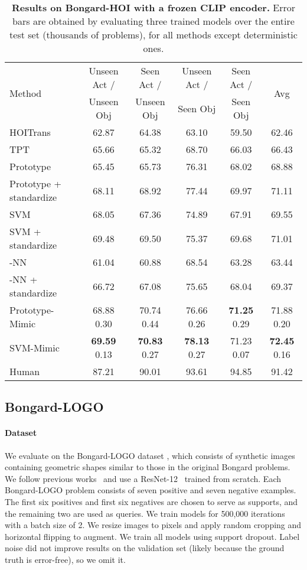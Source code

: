 \begin{table*}
  \centering
    \begin{tabular}{lccccc}
    \toprule
    \multirow{2}{*}{Method} & Unseen Act / & Seen Act / & Unseen Act / & Seen Act /  & \multirow{2}{*}{Avg} \\
    & Unseen Obj & Unseen Obj & Seen Obj & Seen Obj & \\
    \midrule
    HOITrans~\cite{zou2021endtoend} &  62.87  &  64.38  &  63.10  &  59.50  &  62.46  \\
    TPT~\cite{shu2022testtime} &  65.66  &  65.32  &  68.70  &  66.03  &  66.43  \\
    \midrule
    Prototype &  65.45  &  65.73  &  76.31  &  68.02  &  68.88  \\
    Prototype + standardize &  68.11  &  68.92  &  77.44  &  69.97  &  71.11  \\
    SVM & 68.05 & 67.36 & 74.89 & 67.91 & 69.55 \\
    SVM + standardize & 69.48 & 69.50 & 75.37 & 69.68 & 71.01 \\
    -NN & 61.04 & 60.88 & 68.54 & 63.28 & 63.44 \\
    -NN + standardize & 66.72 & 67.08 & 75.65 & 68.04 & 69.37 \\
    Prototype-Mimic&   68.88  0.30 & 70.74  0.44 & 76.66  0.26 & \textbf{71.25}  0.29 & 71.88  0.20 \\
    SVM-Mimic & \textbf{69.59}  0.13 & \textbf{70.83}  0.27 & \textbf{78.13}  0.27 & 71.23  0.07 & \textbf{72.45}  0.16 \\
    \midrule
    Human~\cite{jiang2023bongardhoi} &  87.21  &  90.01  &  93.61  &  94.85  &  91.42  \\
    \bottomrule
  \end{tabular}
    \caption{\textbf{Results on Bongard-HOI with a frozen CLIP encoder.}
    Error bars are obtained by evaluating three trained models over the entire test set (thousands of problems), for all methods except deterministic ones.}
    \label{tab:hoi-table}
\end{table*}

\subsection{Bongard-LOGO}
\paragraph{Dataset}
We evaluate on the Bongard-LOGO dataset \cite{nie2021bongardlogo}, which consists of synthetic images containing geometric shapes similar to those in the original Bongard problems.
We follow previous works~\cite{nie2021bongardlogo} and use a ResNet-12~\cite{he2016deep} trained from scratch. Each Bongard-LOGO problem consists of seven positive and seven negative examples. The first six positives and first six negatives are chosen to serve as supports, and the remaining two are used as queries.
We train models for 500,000 iterations with a batch size of 2. We resize images to  pixels and apply random cropping and horizontal flipping to augment. We train all models using support dropout. Label noise did not improve results on the validation set (likely because the ground truth is error-free), so we omit it.

